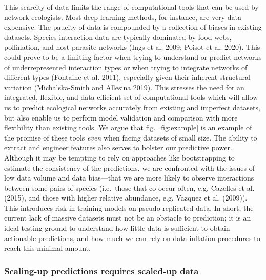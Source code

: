 \documentclass[11pt]{article}
\begin{document}
This scarcity of data limits the range of computational tools that can
be used by network ecologists. Most deep learning methods, for instance,
are very data expensive. The paucity of data is compounded by a
collection of biases in existing datasets. Species interaction data are
typically dominated by food webs, pollination, and host-parasite
networks (Ings et al. 2009; Poisot et al. 2020). This could prove to be
a limiting factor when trying to understand or predict networks of
underrepresented interaction types or when trying to integrate networks
of different types (Fontaine et al. 2011), especially given their
inherent structural variation (Michalska-Smith and Allesina 2019). This
stresses the need for an integrated, flexible, and data-efficient set of
computational tools which will allow us to predict ecological networks
accurately from existing and imperfect datasets, but also enable us to
perform model validation and comparison with more flexibility than
existing tools. We argue that fig.~\ref{fig:example} is an example of
the promise of these tools \emph{even} when facing datasets of small
size. The ability to extract and engineer features also serves to
bolster our predictive power. Although it may be tempting to rely on
approaches like bootstrapping to estimate the consistency of the
predictions, we are confronted with the issues of low data volume and
data bias---that we are more likely to observe interactions between some
pairs of species (i.e.~those that co-occur often, e.g. Cazelles et al.
(2015), and those with higher relative abundance, e.g. Vazquez et al.
(2009)). This introduces risk in training models on pseudo-replicated
data. In short, the current lack of massive datasets must not be an
obstacle to prediction; it is an ideal testing ground to understand how
little data is sufficient to obtain actionable predictions, and how much
we can rely on data inflation procedures to reach this minimal amount.

\hypertarget{scaling-up-predictions-requires-scaled-up-data}{%
\subsubsection{Scaling-up predictions requires scaled-up
data}\label{scaling-up-predictions-requires-scaled-up-data}}
\end{document}
